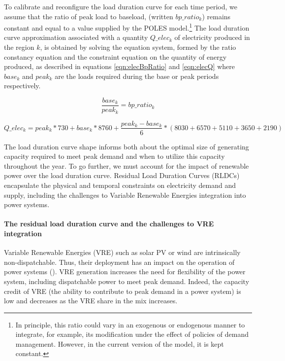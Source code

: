 {To calibrate and reconfigure the load duration curve for each time period, we assume that the ratio of peak load to baseload, (written $bp\_ratio_k$) remains constant and equal to a value supplied by the POLES model.\footnote{
    In principle, this ratio could vary in an exogenous or endogenous manner to integrate, for example, its modification under the effect of policies of demand management. However, in the current version of the model, it is kept constant.
}
The load duration curve approximation associated with a quantity $Q\_elec_k$ of electricity produced in the region $k$, is obtained by solving the equation system, formed by the ratio constancy equation and the constraint equation on the quantity of energy produced, as described in equations \ref{eqn:elecBpRatio} and  \ref{eqn:elecQ}
where $base_k$ and $peak_k$ are the loads required during the base or peak periods respectively.

\begin{dmath}
    \frac{base_k}{peak_k} = bp\_ratio_k
    \label{eqn:elecBpRatio}
\end{dmath}

\begin{dmath}
        Q\_elec_k =
        peak_k * 730 +
        base_k * 8760 + \frac{peak_k - base_k}{6} * ( 8030 + 6570 + 5110 + 3650 + 2190) 
    \label{eqn:elecQ}
\end{dmath}

The load duration curve shape informs both about the optimal size of generating capacity required to meet peak demand and when to utilize this capacity throughout the year. To go further, we must account for the impact of renewable power over the load duration curve. Residual Load Duration Curves (RLDCs) encapsulate the physical and temporal constraints on electricity demand and supply, including the challenges to Variable Renewable Energies integration into power systems. 

 \paragraph{The residual load duration curve and the challenges to VRE integration }

 Variable Renewable Energies (VRE) such as solar PV or wind are intrinsically non-dispatchable. Thus, their deployment has an impact on the operation of power systems (\cite{Hirth2015}). VRE generation increases the need for flexibility of the power system, including dispatchable power to meet peak demand. Indeed, the capacity credit of VRE (the ability to contribute to peak demand in a power system) is low and decreases as the VRE share in the mix increases. 
 
}
